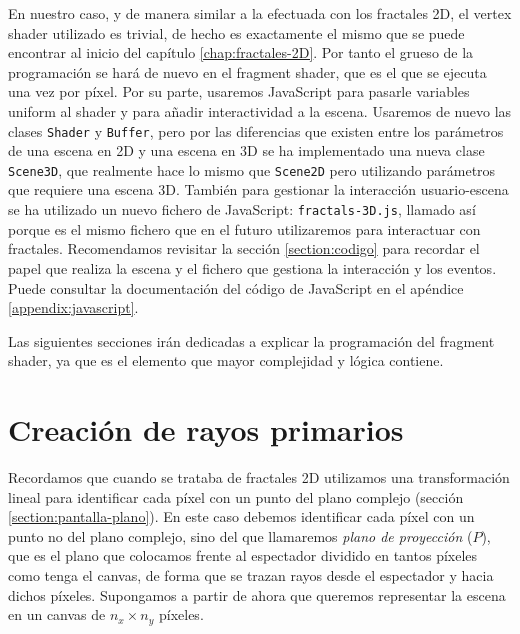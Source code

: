 En nuestro caso, y de manera similar a la efectuada con los fractales 2D, el vertex shader utilizado es trivial, de hecho es exactamente el mismo que se puede encontrar al inicio del capítulo \ref{chap:fractales-2D}. Por tanto el grueso de la programación se hará de nuevo en el fragment shader, que es el que se ejecuta una vez por píxel. Por su parte, usaremos JavaScript para pasarle variables uniform al shader y para añadir interactividad a la escena. Usaremos de nuevo las clases \verb|Shader| y \verb|Buffer|, pero por las diferencias que existen entre los parámetros de una escena en 2D y una escena en 3D se ha implementado una nueva clase \verb|Scene3D|, que realmente hace lo mismo que \verb|Scene2D| pero utilizando parámetros que requiere una escena 3D. También para gestionar la interacción usuario-escena se ha utilizado un nuevo fichero de JavaScript: \verb|fractals-3D.js|, llamado así porque es el mismo fichero que en el futuro utilizaremos para interactuar con fractales. Recomendamos revisitar la sección \ref{section:codigo} para recordar el papel que realiza la escena y el fichero que gestiona la interacción y los eventos. Puede consultar la documentación del código de JavaScript en el apéndice \ref{appendix:javascript}.

Las siguientes secciones irán dedicadas a explicar la programación del fragment shader, ya que es el elemento que mayor complejidad y lógica contiene.

\section{Creación de rayos primarios}
\label{section:rayo}

Recordamos que cuando se trataba de fractales 2D utilizamos una transformación lineal para identificar cada píxel con un punto del plano complejo (sección \ref{section:pantalla-plano}). En este caso debemos identificar cada píxel con un punto no del plano complejo, sino del que llamaremos \textit{plano de proyección} ($P$), que es el plano que colocamos frente al espectador dividido en tantos píxeles como tenga el canvas, de forma que se trazan rayos desde el espectador y hacia dichos píxeles. Supongamos a partir de ahora que queremos representar la escena en un canvas de $n_x\times n_y$ píxeles.

